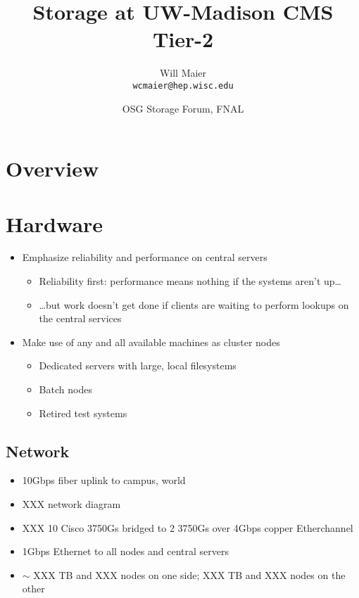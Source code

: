 \documentclass{beamer}
\title{Storage at UW-Madison CMS Tier-2}
\author[Maier]{
    Will Maier \\ 
    {\tt wcmaier@hep.wisc.edu}}
\institute[Wisconsin]{University of Wisconsin - High Energy Physics}
\date[2009.06.30]{OSG Storage Forum, FNAL}
\newcommand{\ca}{\ensuremath{\sim}}
\begin{document}

\begin{frame}
    \titlepage
\end{frame}

\section{Overview}
\begin{frame}
    \tableofcontents
\end{frame}

\section{Hardware}
\begin{frame}
\begin{itemize}
	\item Emphasize reliability and performance on central servers
	\begin{itemize}
		\item Reliability first: performance means nothing if the systems aren't up\ldots{}
		\item \ldots{}but work doesn't get done if clients are waiting to perform lookups on the central services
	\end{itemize}
	\item Make use of any and all available machines as cluster nodes
	\begin{itemize}
		\item Dedicated servers with large, local filesystems
		\item Batch nodes
		\item Retired test systems
	\end{itemize}
\end{itemize}
\end{frame}

\subsection{Network}
\begin{frame}
\begin{itemize}
	\item 10Gbps fiber uplink to campus, world
	\item XXX network diagram
	\item XXX 10 Cisco 3750Gs bridged to 2 3750Gs over 4Gbps copper Etherchannel
	\item 1Gbps Ethernet to all nodes and central servers
	\item \ca{} XXX TB and XXX nodes on one side; XXX TB and XXX nodes on the other
\end{itemize}
\end{frame}
\end{document}
